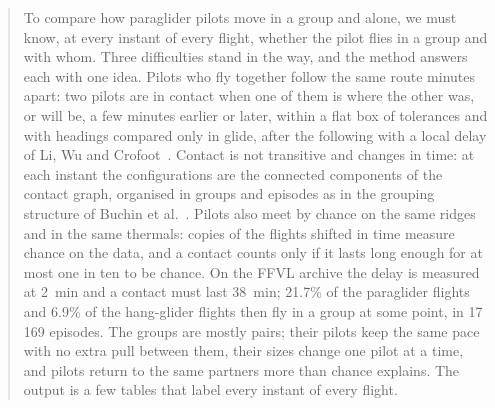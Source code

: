 \begin{abstract}
\noindent
To compare how paraglider pilots move in a group and alone, we must know, at every instant of
every flight, whether the pilot flies in a group and with whom. Three difficulties stand in the
way, and the method answers each with one idea. Pilots who fly together follow the same route
minutes apart: two pilots are in contact when one of them is where the other was, or will be, a
few minutes earlier or later, within a flat box of tolerances and with headings compared only in
glide, after the following with a local delay of Li, Wu and Crofoot~\cite{li2013}. Contact is not
transitive and changes in time: at each instant the configurations are the connected components of
the contact graph, organised in groups and episodes as in the grouping structure of Buchin et
al.~\cite{buchin2015}. Pilots also meet by chance on the same ridges and in the same thermals:
copies of the flights shifted in time measure chance on the data, and a contact counts only if it
lasts long enough for at most one in ten to be chance. On the FFVL archive the delay is measured at
2~min and a contact must last 38~min; 21.7\% of the paraglider flights and 6.9\% of the hang-glider
flights then fly in a group at some point, in 17\,169 episodes. The groups are mostly pairs; their
pilots keep the same pace with no extra pull between them, their sizes change one pilot at a time,
and pilots return to the same partners more than chance explains. The output is a few tables that
label every instant of every flight.
\end{abstract}
